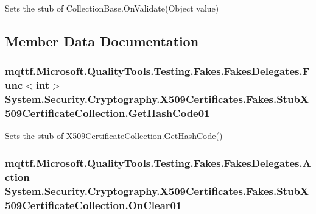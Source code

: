 Sets the stub of Collection\-Base.\-On\-Validate(\-Object value)



\subsection{Member Data Documentation}
\hypertarget{class_system_1_1_security_1_1_cryptography_1_1_x509_certificates_1_1_fakes_1_1_stub_x509_certificate_collection_a9526c4b27796bdf093cd82e19348591e}{
\subsubsection[{Get\-Hash\-Code01}]{\setlength{\rightskip}{0pt plus 5cm}mqttf.\-Microsoft.\-Quality\-Tools.\-Testing.\-Fakes.\-Fakes\-Delegates.\-Func$<$int$>$ System.\-Security.\-Cryptography.\-X509\-Certificates.\-Fakes.\-Stub\-X509\-Certificate\-Collection.\-Get\-Hash\-Code01}}\label{class_system_1_1_security_1_1_cryptography_1_1_x509_certificates_1_1_fakes_1_1_stub_x509_certificate_collection_a9526c4b27796bdf093cd82e19348591e}


Sets the stub of X509\-Certificate\-Collection.\-Get\-Hash\-Code()

\hypertarget{class_system_1_1_security_1_1_cryptography_1_1_x509_certificates_1_1_fakes_1_1_stub_x509_certificate_collection_ad2d993560b29f0112c9955212815fe15}{
\subsubsection[{On\-Clear01}]{\setlength{\rightskip}{0pt plus 5cm}mqttf.\-Microsoft.\-Quality\-Tools.\-Testing.\-Fakes.\-Fakes\-Delegates.\-Action System.\-Security.\-Cryptography.\-X509\-Certificates.\-Fakes.\-Stub\-X509\-Certificate\-Collection.\-On\-Clear01}}\label{class_system_1_1_security_1_1_cryptography_1_1_x509_certificates_1_1_fakes_1_1_stub_x509_certificate_collection_ad2d993560b29f0112c9955212815fe15}


